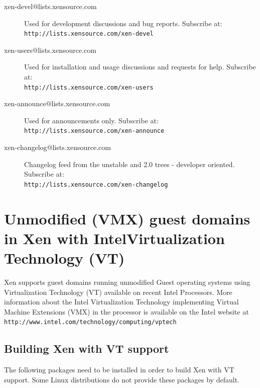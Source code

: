 \documentclass[11pt,twoside,final,openright]{report}
\begin{document}
\begin{description}
\item[xen-devel@lists.xensource.com] Used for development
  discussions and bug reports.  Subscribe at: \\
  {\small {\tt http://lists.xensource.com/xen-devel}}
\item[xen-users@lists.xensource.com] Used for installation and usage
  discussions and requests for help.  Subscribe at: \\
  {\small {\tt http://lists.xensource.com/xen-users}}
\item[xen-announce@lists.xensource.com] Used for announcements only.
  Subscribe at: \\
  {\small {\tt http://lists.xensource.com/xen-announce}}
\item[xen-changelog@lists.xensource.com] Changelog feed
  from the unstable and 2.0 trees - developer oriented.  Subscribe at: \\
  {\small {\tt http://lists.xensource.com/xen-changelog}}
\end{description}




\appendix

\chapter{Unmodified (VMX) guest domains in Xen with Intel\textregistered Virtualization Technology (VT)}

Xen supports guest domains running unmodified Guest operating systems using Virtualization Technology (VT) available on recent Intel Processors. More information about the Intel Virtualization Technology implementing Virtual Machine Extensions (VMX) in the processor is available on the Intel website at \\
 {\small {\tt http://www.intel.com/technology/computing/vptech}}

\section{Building Xen with VT support}

The following packages need to be installed in order to build Xen with VT support. Some Linux distributions do not provide these packages by default.
\end{document}
